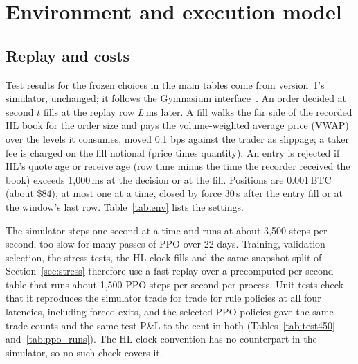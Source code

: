 \documentclass[12pt,a4paper]{article}
\DeclareRobustCommand{\bps}{\ifmmode\,\text{bps}\else\,bps\fi}
\newcommand{\usd}[1]{\$#1}
\begin{document}
\section{Environment and execution model}\label{sec:env}

\subsection{Replay and costs}
Test results for the frozen choices in the main tables come from version~1's simulator,
unchanged; it follows the Gymnasium interface~\cite{gym}. An order decided at second $t$ fills
at the replay row $L$\,ms later. A fill walks the far side of the recorded HL book for the
order size and pays the volume-weighted average price (VWAP) over the levels it consumes,
moved 0.1\bps{} against the trader as slippage; a taker fee is charged on the fill notional
(price times quantity). An entry is rejected if HL's quote age or receive age (row time minus
the time the recorder received the book) exceeds 1,000\,ms at the decision or at the fill.
Positions are 0.001\,BTC (about \usd{84}), at most one at a time, closed by force 30\,s after
the entry fill or at the window's last row. Table~\ref{tab:env} lists the settings.

The simulator steps one second at a time and runs at about 3,500 steps per second, too slow
for many passes of PPO over 22 days. Training, validation selection, the stress tests, the
HL-clock fills and the same-snapshot split of Section~\ref{sec:stress} therefore use a fast
replay over a precomputed per-second table that runs about 1,500 PPO steps per second per
process. Unit tests check that it reproduces the simulator trade for trade for rule policies
at all four latencies, including forced exits, and the selected PPO policies gave the same
trade counts and the same test P\&L to the cent in both (Tables~\ref{tab:test450}
and~\ref{tab:ppo_runs}). The HL-clock
convention has no counterpart in the simulator, so no such check covers it.
\end{document}
